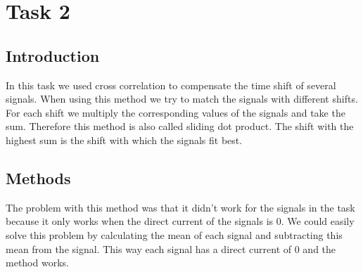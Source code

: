 \documentclass[11pt,a4paper]{article}
\begin{document}
\section{Task 2} \label{section:task2}
\subsection{Introduction}
In this task we used cross correlation to compensate the time shift of several signals. When using this method we try to match the signals with different shifts. For each shift we multiply the corresponding values of the signals and take the sum. Therefore this method is also called sliding dot product. The shift with the highest sum is the shift with which the signals fit best. 

\label{sec:intro}

\subsection{Methods}


The problem with this method was that it didn't work for the signals in the task because it only works when the direct current of the signals is 0. We could easily solve this problem by calculating the mean of each signal and subtracting this mean from the signal. This way each signal has a direct current of 0 and the method works.  
\end{document}
